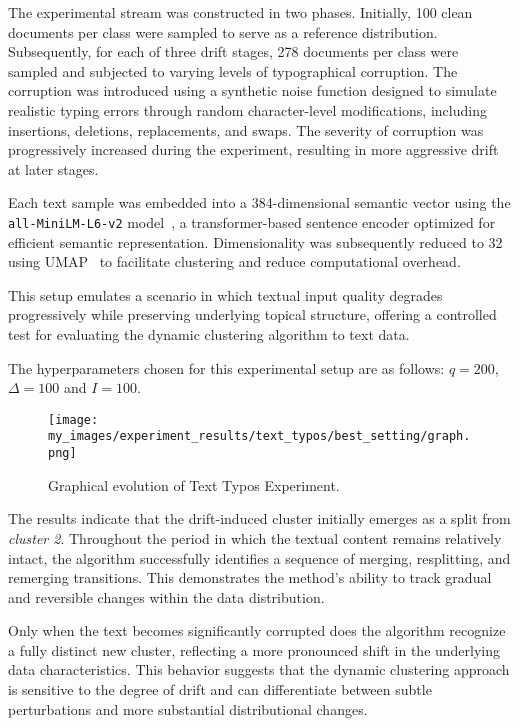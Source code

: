 The experimental stream was constructed in two phases. Initially, 100 clean
documents per class were sampled to serve as a reference distribution.
Subsequently, for each of three drift stages, 278 documents per class were
sampled and subjected to varying levels of typographical corruption. The
corruption was introduced using a synthetic noise function designed to simulate
realistic typing errors through random character-level modifications, including
insertions, deletions, replacements, and swaps. The severity of corruption was
progressively increased during the experiment, resulting in more aggressive
drift at later stages.

Each text sample was embedded into a 384-dimensional semantic vector using the
\texttt{all\allowbreak-MiniLM\allowbreak-L6\allowbreak-v2}
model~\cite{sentence-transformers}, a transformer-based sentence encoder
optimized for efficient semantic representation. Dimensionality was
subsequently reduced to 32 using UMAP~\cite{umap} to facilitate clustering and
reduce computational overhead.

This setup emulates a scenario in which textual input quality degrades
progressively while preserving underlying topical structure, offering a
controlled test for evaluating the dynamic clustering algorithm to text data.

The hyperparameters chosen for this experimental setup are as follows: $q =
      200$, $\Delta = 100$ and $I=100$.

\begin{figure}[H]
      \centering
      \texttt{[image: my\_images/experiment\_results/text\_typos/best\_setting/graph.png]}
      \caption{Graphical evolution of Text Typos Experiment.}
\end{figure}

The results indicate that the drift-induced cluster initially emerges as a
split from \emph{cluster 2}. Throughout the period in which the textual content
remains relatively intact, the algorithm successfully identifies a sequence of
merging, resplitting, and remerging transitions. This demonstrates the method's
ability to track gradual and reversible changes within the data distribution.

Only when the text becomes significantly corrupted does the algorithm recognize
a fully distinct new cluster, reflecting a more pronounced shift in the
underlying data characteristics. This behavior suggests that the dynamic
clustering approach is sensitive to the degree of drift and can differentiate
between subtle perturbations and more substantial distributional changes.

